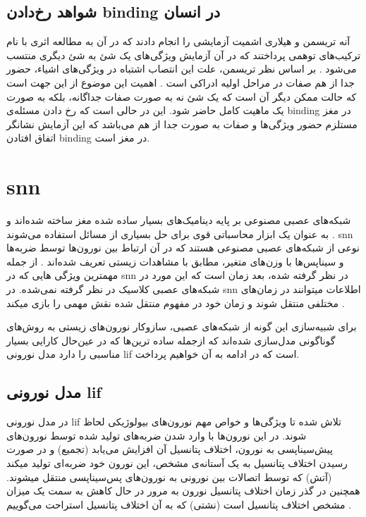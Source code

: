 \documentclass[12pt]{report}
\begin{document}
	
	\subsection{شواهد رخ‌دادن \gls{binding} در انسان}
	
	آنه تریسمن
	و هیلاری اشمیت
	آزمایشی را انجام دادند که در آن به مطالعه اثری با نام ترکیب‌های توهمی
	پرداختند که در آن آزمایش ویژگی‌های یک شئ به شئ دیگری منتسب می‌شود
	\cite{TREISMAN1982107}.
	بر اساس نظر تریسمن، علت این انتصاب اشتباه در ویژگی‌های اشیاء، حضور جدا از هم صفات در مراحل اولیه ادراکی است
	\cite{goldstein_2019}.
	اهمیت این موضوع از این جهت است که حالت ممکن دیگر آن است که یک شئ نه به صورت صفات جداگانه، بلکه به صورت یک ماهیت کامل حاضر شود. این در حالی است که رخ دادن مسئله‌ی \gls{binding} در مغز مستلزم حضور ویژگی‌ها و صفات به صورت جدا از هم می‌باشد که این آزمایش نشانگر اتفاق افتادن \gls{binding} در مغز است.
	
	
	\section{\gls{snn}}
	شبکه‌های عصبی مصنوعی بر پایه دینامیک‌های بسیار ساده شده مغز ساخته شده‌اند و به عنوان یک ابزار محاسباتی قوی برای حل بسیاری از مسائل استفاده می‌شوند
	\cite{TGNN}. 
	\gls{snn} نوعی از شبکه‌های عصبی مصنوعی هستند که در آن ارتباط بین نورون‌ها توسط ضربه‌ها و سیناپس‌ها  با وزن‌های متغیر، مطابق با مشاهدات زیستی تعریف شده‌اند
	\cite{ghosh2009spiking}. 
	از جمله مهمترین ویژگی هایی که در \gls{snn} در نظر گرفته شده، بعد زمان است
	\cite{Mozafari2019}
	که این مورد در شبکه‌های عصبی کلاسیک در نظر گرفته نمی‌شده. در \gls{snn} اطلاعات میتوانند در زمان‌های مختلفی منتقل شوند و زمان خود در مفهوم منتقل شده نقش مهمی را بازی میکند
	\cite{SNN1997}.
	
	برای شبیه‌سازی این گونه از شبکه‌های عصبی، سازوکار نورون‌های زیستی به روش‌‌های گوناگونی مدل‌سازی شده‌اند که ازجمله ساده ترین‌ها که در عین‌حال کارایی بسیار مناسبی را دارد مدل نورونی \gls{lif} است که در ادامه به آن خواهیم پرداخت.
	
	
	\subsection{مدل نورونی \gls{lif}}
	در مدل نورونی \gls{lif} تلاش شده تا ویژگی‌ها و خواص مهم نورون‌های بیولوژیکی لحاظ شوند. در این نورون‌ها با وارد شدن ضربه‌های تولید شده توسط نورون‌های پیش‌سیناپسی به نورون، اختلاف پتانسیل آن افزایش می‌یابد (تجمیع) و در صورت رسیدن اختلاف پتانسیل به یک آستانه‌ی مشخص، این نورون خود ضربه‌ای تولید میکند (آتش) که توسط اتصالات بین نورونی به نورون‌های پس‌سیناپسی منتقل میشوند. همچنین در گذر زمان اختلاف پتانسیل نورون به مرور در حال کاهش به سمت یک میزان مشخص اختلاف پتانسیل است (نشتی) که به آن اختلاف پتانسیل استراحت می‌گوییم
	\cite{gerstner2014neuronal}.
	
\end{document}
